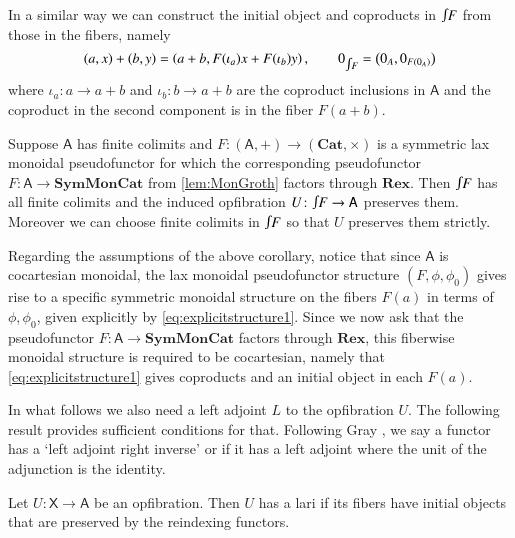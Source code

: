 \documentclass[reqno]{amsart}
\let\maps\colon
\theoremstyle{definition}
\theoremstyle{remark}
\newcommand{\A}{\mathsf{A}}
\newcommand{\X}{\mathsf{X}}
\newcommand{\bicat}{\mathbf}
\newcommand{\Cat}{\bicat{Cat}}
\newcommand{\Rex}{\bicat{Rex}}
\newcommand{\SMC}{\bicat{SymMonCat}}
\newcommand{\define}[1]{{\bf \boldmath{#1}}}
\newcommand{\inta}{\raisebox{.3\depth}{$\smallint\hspace{-.01in}$}}
\begin{document}
In a similar way we can construct the initial object and coproducts in $\inta F$ from those in the fibers, namely
\begin{equation}\label{eq:fibrewisecoprod}
(a,x)+(b,y)=\left(a+ b,F(\iota_a)x+F(\iota_b)y\right), \qquad 
 0_{\inta F}=\left(0_A,0_{F(0_A)}\right)
\end{equation}
where $\iota_a \maps a\to a+b$ and $\iota_b \maps b \to a+b$ are the coproduct inclusions in $\A$ and the coproduct in the second component is in the fiber $F(a+b)$. 
\fi

\begin{cor} \label{cor:fcocMonGroth}
 Suppose $\A$ has finite colimits and $F \maps (\A,+) \to (\Cat,\times)$ is a symmetric lax monoidal pseudofunctor for which the corresponding pseudofunctor $F  \maps \A \to \SMC$ from \cref{lem:MonGroth} factors through $\Rex$.  Then $\inta F$ has all finite colimits and  the induced opfibration $U\maps \inta F \to \A$ preserves them.  Moreover we can choose finite colimits in $\inta F$ so that $U$ preserves them strictly.
\end{cor}

Regarding the assumptions of the above corollary, notice that since $\A$ is cocartesian monoidal, the lax monoidal pseudofunc\-tor structure $(F,\phi,\phi_0)$ gives rise to a specific symmetric monoidal structure on the fibers $F(a)$ in terms of $\phi,\phi_0$, given explicitly by \cref{eq:explicitstructure1}. Since we now ask that the pseudofunctor $F\maps \A\to\SMC$ factors through $\Rex$, this fiberwise monoidal structure is required to be cocartesian, namely that \cref{eq:explicitstructure1} gives coproducts and an initial object in each $F(a)$.

In what follows we also need a left adjoint $L$ to the opfibration $U$.  The following result provides sufficient conditions for that.  Following Gray \cite{Gray}, we say a functor has a `left adjoint right inverse' or \define{lari} if it has a left adjoint where the unit of the adjunction is the identity.

\begin{lem} \label{prop:opfibtolari}
Let $U \maps\X \to \A$ be an opfibration.   Then $U$ has a lari if its fibers have initial objects
that are preserved by the reindexing functors.
\end{lem}
\end{document}
